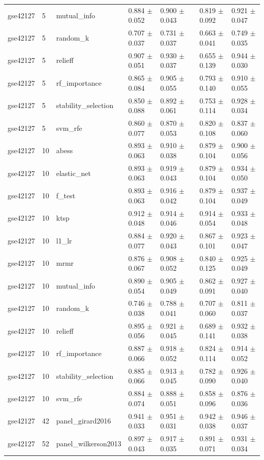 \begin{table}[t]
\begin{tabular}{llllllll}
    gse42127 & 5 & mutual\_info & 0.884 $\pm$ 0.052 & 0.900 $\pm$ 0.043 &  & 0.819 $\pm$ 0.092 & 0.921 $\pm$ 0.047 \\
    gse42127 & 5 & random\_k & 0.707 $\pm$ 0.037 & 0.731 $\pm$ 0.037 &  & 0.663 $\pm$ 0.041 & 0.749 $\pm$ 0.035 \\
    gse42127 & 5 & relieff & 0.907 $\pm$ 0.051 & 0.930 $\pm$ 0.037 &  & 0.655 $\pm$ 0.139 & 0.944 $\pm$ 0.030 \\
    gse42127 & 5 & rf\_importance & 0.865 $\pm$ 0.084 & 0.905 $\pm$ 0.055 &  & 0.793 $\pm$ 0.140 & 0.910 $\pm$ 0.055 \\
    gse42127 & 5 & stability\_selection & 0.850 $\pm$ 0.088 & 0.892 $\pm$ 0.061 &  & 0.753 $\pm$ 0.114 & 0.928 $\pm$ 0.034 \\
    gse42127 & 5 & svm\_rfe & 0.860 $\pm$ 0.077 & 0.870 $\pm$ 0.053 &  & 0.820 $\pm$ 0.108 & 0.837 $\pm$ 0.060 \\
    gse42127 & 10 & abess & 0.893 $\pm$ 0.063 & 0.910 $\pm$ 0.038 &  & 0.879 $\pm$ 0.104 & 0.900 $\pm$ 0.056 \\
    gse42127 & 10 & elastic\_net & 0.893 $\pm$ 0.063 & 0.919 $\pm$ 0.043 &  & 0.879 $\pm$ 0.104 & 0.934 $\pm$ 0.050 \\
    gse42127 & 10 & f\_test & 0.893 $\pm$ 0.063 & 0.916 $\pm$ 0.042 &  & 0.879 $\pm$ 0.104 & 0.937 $\pm$ 0.049 \\
    gse42127 & 10 & ktsp & 0.912 $\pm$ 0.048 & 0.914 $\pm$ 0.046 &  & 0.914 $\pm$ 0.054 & 0.933 $\pm$ 0.048 \\
    gse42127 & 10 & l1\_lr & 0.884 $\pm$ 0.077 & 0.920 $\pm$ 0.043 &  & 0.867 $\pm$ 0.101 & 0.923 $\pm$ 0.047 \\
    gse42127 & 10 & mrmr & 0.876 $\pm$ 0.067 & 0.908 $\pm$ 0.052 &  & 0.840 $\pm$ 0.125 & 0.925 $\pm$ 0.049 \\
    gse42127 & 10 & mutual\_info & 0.890 $\pm$ 0.054 & 0.905 $\pm$ 0.049 &  & 0.862 $\pm$ 0.091 & 0.927 $\pm$ 0.040 \\
    gse42127 & 10 & random\_k & 0.746 $\pm$ 0.038 & 0.788 $\pm$ 0.041 &  & 0.707 $\pm$ 0.060 & 0.811 $\pm$ 0.037 \\
    gse42127 & 10 & relieff & 0.895 $\pm$ 0.056 & 0.921 $\pm$ 0.045 &  & 0.689 $\pm$ 0.141 & 0.932 $\pm$ 0.038 \\
    gse42127 & 10 & rf\_importance & 0.887 $\pm$ 0.066 & 0.918 $\pm$ 0.052 &  & 0.824 $\pm$ 0.114 & 0.914 $\pm$ 0.052 \\
    gse42127 & 10 & stability\_selection & 0.885 $\pm$ 0.066 & 0.913 $\pm$ 0.045 &  & 0.782 $\pm$ 0.090 & 0.926 $\pm$ 0.040 \\
    gse42127 & 10 & svm\_rfe & 0.884 $\pm$ 0.074 & 0.888 $\pm$ 0.051 &  & 0.858 $\pm$ 0.096 & 0.876 $\pm$ 0.036 \\
    gse42127 & 42 & panel\_girard2016 & 0.941 $\pm$ 0.033 & 0.951 $\pm$ 0.031 &  & 0.942 $\pm$ 0.038 & 0.946 $\pm$ 0.037 \\
    gse42127 & 52 & panel\_wilkerson2013 & 0.897 $\pm$ 0.043 & 0.917 $\pm$ 0.035 &  & 0.891 $\pm$ 0.071 & 0.931 $\pm$ 0.034 \\
    \bottomrule
  \end{tabular}
\end{table}
